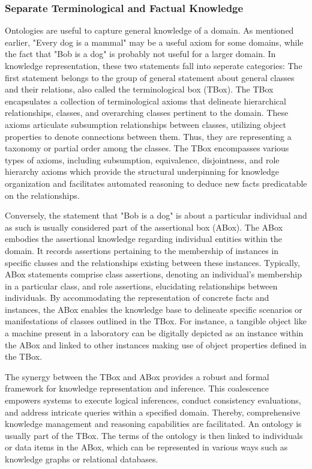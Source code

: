 
\subsubsection{Separate Terminological and Factual Knowledge}

Ontologies are useful to capture general knowledge of a domain. As mentioned earlier, "Every dog is a mammal" may be a useful axiom for some domains, while the fact that "Bob is a dog" is probably not useful for a larger domain. In knowledge representation, these two statements fall into seperate categories:
The first statement belongs to the group of general statement about general classes and their relations, also called the terminological box (TBox). The TBox encapsulates a collection of terminological axioms that delineate hierarchical relationships, classes, and overarching classes pertinent to the domain. These axioms articulate subsumption relationships between classes, utilizing object properties to denote connections between them. Thus, they are representing a taxonomy or partial order among the classes. The TBox encompasses various types of axioms, including subsumption, equivalence, disjointness, and role hierarchy axioms which provide the structural underpinning for knowledge organization and facilitates automated reasoning to deduce new facts predicatable on the relationships.

Conversely, the statement that "Bob is a dog" is about a particular individual and as such is usually considered part of the assertional box (ABox). The ABox embodies the assertional knowledge regarding individual entities within the domain. It records assertions pertaining to the membership of instances in specific classes and the relationships existing between these instances. Typically, ABox statements comprise class assertions, denoting an individual's membership in a particular class, and role assertions, elucidating relationships between individuals. By accommodating the representation of concrete facts and instances, the ABox enables the knowledge base to delineate specific scenarios or manifestations of classes outlined in the TBox. For instance, a tangible object like a machine present in a laboratory can be digitally depicted as an instance within the ABox and linked to other instances making use of object properties defined in the TBox.

The synergy between the TBox and ABox provides a robust and formal framework for knowledge representation and inference. This coalescence empowers systems to execute logical inferences, conduct consistency evaluations, and address intricate queries within a specified domain. Thereby, comprehensive knowledge management and reasoning capabilities are facilitated. An ontology is usually part of the TBox. The terms of the ontology is then linked to individuals or data items in the ABox, which can be represented in various ways such as knowledge graphs or relational databases.

